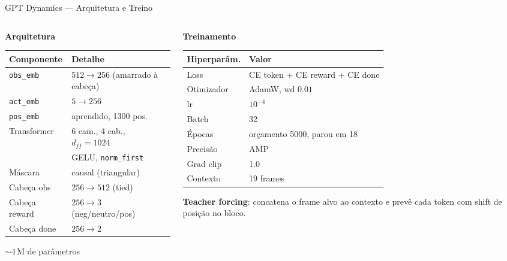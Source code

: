 \documentclass[11pt,aspectratio=169]{beamer}
\begin{document}
\begin{frame}{GPT Dynamics --- Arquitetura e Treino}
  \begin{columns}[T]
    \begin{column}{0.52\textwidth}
      \textbf{Arquitetura}
      \footnotesize
      \begin{table}
        \begin{tabular}{ll}
          \toprule
          Componente & Detalhe \\
          \midrule
          \texttt{obs\_emb} & $512 \to 256$ (amarrado à cabeça) \\
          \texttt{act\_emb} & $5 \to 256$ \\
          \texttt{pos\_emb} & aprendido, 1300 pos. \\
          Transformer & 6 cam., 4 cab., $d_{ff}{=}1024$ \\
                       & GELU, \texttt{norm\_first} \\
          Máscara & causal (triangular) \\
          Cabeça obs & $256 \to 512$ (tied) \\
          Cabeça reward & $256 \to 3$ (neg/neutro/pos) \\
          Cabeça done & $256 \to 2$ \\
          \bottomrule
        \end{tabular}
      \end{table}
      {\scriptsize$\sim$4\,M de parâmetros}
    \end{column}
    \begin{column}{0.46\textwidth}
      \textbf{Treinamento}
      \footnotesize
      \begin{table}
        \begin{tabular}{ll}
          \toprule
          Hiperparâm. & Valor \\
          \midrule
          Loss & CE token + CE reward + CE done \\
          Otimizador & AdamW, wd $0.01$ \\
          lr & $10^{-4}$ \\
          Batch & 32 \\
          Épocas & orçamento 5000, parou em 18 \\
          Precisão & AMP \\
          Grad clip & 1.0 \\
          Contexto & 19 frames \\
          \bottomrule
        \end{tabular}
      \end{table}
      \smallskip
      {\scriptsize\textbf{Teacher forcing}: concatena o frame alvo ao contexto
      e prevê cada token com shift de posição no bloco.}
    \end{column}
  \end{columns}
\end{frame}
\end{document}
